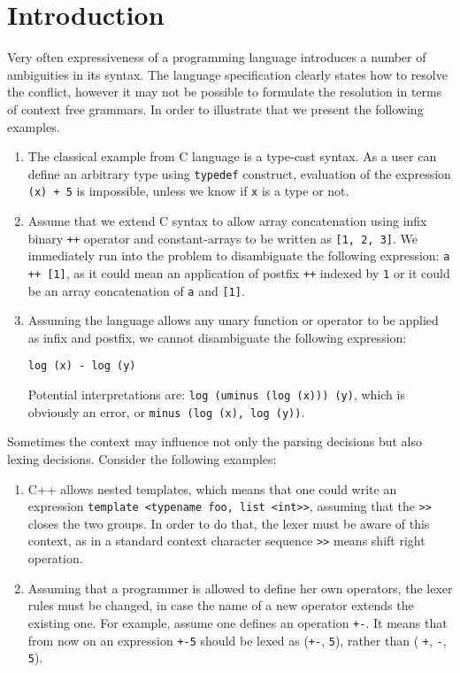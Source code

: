 \section{\label{sec:intro}Introduction}

Very often expressiveness of a programming language introduces a number of
ambiguities in its syntax.  The language specification clearly states how to
resolve the conflict, however it may not be possible to formulate the
resolution in terms of context free grammars.  In order to illustrate that we
present the following examples.

\begin{enumerate}
    \item The classical example from C language is a type-cast 
          syntax.  As a user can define an arbitrary type using
          \verb|typedef| construct, evaluation of the expression
          \verb|(x) + 5| is impossible, unless we know if
          \verb|x| is a type or not.
    \item Assume that we extend C syntax to allow array 
          concatenation using infix binary \verb|++| operator and
          constant-arrays to be written as \verb|[1, 2, 3]|.
          We immediately run into the problem to disambiguate the 
          following expression: \verb|a ++ [1]|, as it could mean
          an application of postfix \verb|++| indexed by \verb|1|
          or it could be an array concatenation of \verb|a| and 
          \verb|[1]|.
    \item Assuming the language allows any unary function or operator
          to be applied as infix and postfix, we cannot 
          disambiguate the following expression:
\begin{verbatim}
log (x) - log (y)
\end{verbatim}
          Potential interpretations are: 
          \verb|log (uminus (log (x))) (y)|, which is obviously an 
          error, or \verb|minus (log (x), log (y))|.
\end{enumerate}

\noindent
Sometimes the context may influence not only the parsing decisions but 
also lexing decisions.  Consider the following examples:
\begin{enumerate}
    \item C++ allows nested templates, which means that one could
          write an expression \verb|template <typename foo, list <int>>|, 
          assuming that the \verb|>>| closes the two groups.  In
          order to do that, the lexer must be aware of this context,
          as in a standard context character sequence \verb|>>| means
          shift right operation.
    \item Assuming that a programmer is allowed to define her own 
          operators, the lexer rules must be changed, in case 
          the name of a new operator extends the existing one.  For
          example, assume one defines an operation \verb|+-|.
          It means that from now on an expression \verb|+-5| should
          be lexed as (\verb|+-|, \verb|5|), rather than (%
          \verb|+|, \verb|-|, \verb|5|).
\end{enumerate}

